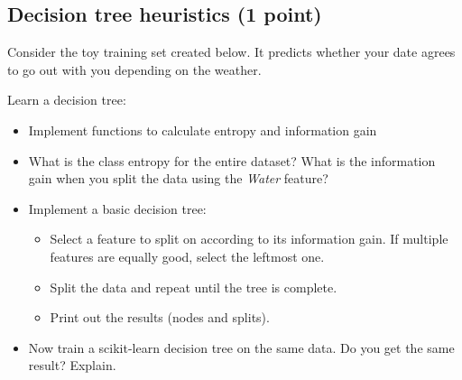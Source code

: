 \documentclass[11pt]{article}
\providecommand{\tightlist}{%
      \setlength{\itemsep}{0pt}\setlength{\parskip}{0pt}}
\begin{document}
    \subsection{Decision tree heuristics (1
point)}\label{decision-tree-heuristics-1-point}

Consider the toy training set created below. It predicts whether your
date agrees to go out with you depending on the weather.

Learn a decision tree:

\begin{itemize}
\tightlist
\item
  Implement functions to calculate entropy and information gain
\item
  What is the class entropy for the entire dataset? What is the
  information gain when you split the data using the \emph{Water}
  feature?
\item
  Implement a basic decision tree:

  \begin{itemize}
  \tightlist
  \item
    Select a feature to split on according to its information gain. If
    multiple features are equally good, select the leftmost one.
  \item
    Split the data and repeat until the tree is complete.
  \item
    Print out the results (nodes and splits).
  \end{itemize}
\item
  Now train a scikit-learn decision tree on the same data. Do you get
  the same result? Explain.
\end{itemize}
\end{document}
